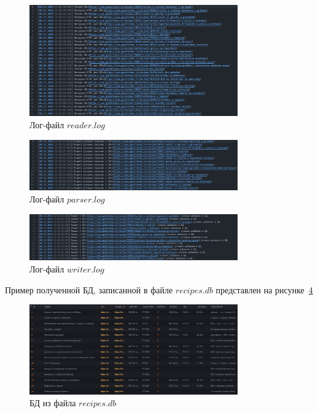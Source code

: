 \begin{figure}[h]
	\centering
	\includegraphics[width=0.8\textwidth]{images/examples/reader_log.png}
	\caption{Лог-файл $reader.log$}
	\label{fig:read}
\end{figure}

\begin{figure}[h]
	\centering
	\includegraphics[width=0.8\textwidth]{images/examples/parser_log.png}
	\caption{Лог-файл $parser.log$}
	\label{fig:par}
\end{figure}

\begin{figure}[h]
	\centering
	\includegraphics[width=0.8\textwidth]{images/examples/writer_log.png}
	\caption{Лог-файл $writer.log$}
	\label{fig:wri}
\end{figure}

\clearpage

Пример полученной БД, записанной в файле $recipes.db$ представлен на рисунке~\ref{fig:db}

\begin{figure}[h]
	\centering
	\includegraphics[width=0.8\textwidth]{images/examples/db_example.png}
	\caption{БД из файла $recipes.db$}
	\label{fig:db}
\end{figure}